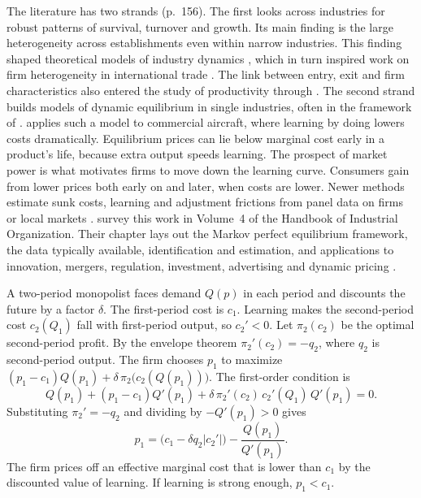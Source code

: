 The literature has two strands (p.~156). The first looks across industries for robust patterns of survival,
turnover and growth. Its main finding is the large heterogeneity across establishments even within narrow
industries. This finding shaped theoretical models of industry dynamics \citep{Hopenhayn1992}, which in turn
inspired work on firm heterogeneity in international trade \citep{Melitz2003}. The link between entry, exit and
firm characteristics also entered the study of productivity through \citet{OlleyPakes1996}. The second strand
builds models of dynamic equilibrium in single industries, often in the framework of \citet{EricsonPakes1995}.
\citet{Benkard2004} applies such a model to commercial aircraft, where learning by doing lowers costs
dramatically. Equilibrium prices can lie below marginal cost early in a product's life, because extra output
speeds learning. The prospect of market power is what motivates firms to move down the learning curve.
Consumers gain from lower prices both early on and later, when costs are lower. Newer methods estimate sunk
costs, learning and adjustment frictions from panel data on firms or local markets
\citep{AguirregabiriaMira2007,BajariBenkardLevin2007,PakesOstrovskyBerry2007}. \citet{AguirregabiriaCollardWexlerRyan2021}
survey this work in Volume~4 of the Handbook of Industrial Organization. Their chapter lays out the Markov
perfect equilibrium framework, the data typically available, identification and estimation, and applications to
innovation, mergers, regulation, investment, advertising and dynamic pricing \citep[Preface, pp.~xvi--xvii]{HoHortacsuLizzeri2021}.

\begin{remark}\label{rem:01-learning}
A two-period monopolist faces demand $Q(p)$ in each period and discounts the future by a factor $\delta$. The
first-period cost is $c_1$. Learning makes the second-period cost $c_2(Q_1)$ fall with first-period output,
so $c_2' < 0$. Let $\pi_2(c_2)$ be the optimal second-period profit. By the envelope theorem
$\pi_2'(c_2) = -q_2$, where $q_2$ is second-period output. The firm chooses $p_1$ to maximize
$(p_1 - c_1)Q(p_1) + \delta\,\pi_2\big(c_2(Q(p_1))\big)$. The first-order condition is
\[
  Q(p_1) + (p_1 - c_1)Q'(p_1) + \delta\,\pi_2'(c_2)\,c_2'(Q_1)\,Q'(p_1) = 0 .
\]
Substituting $\pi_2' = -q_2$ and dividing by $-Q'(p_1) > 0$ gives
\[
  p_1 = \big(c_1 - \delta q_2 \lvert c_2' \rvert\big) - \frac{Q(p_1)}{Q'(p_1)} .
\]
The firm prices off an effective marginal cost that is lower than $c_1$ by the discounted value of learning. If
learning is strong enough, $p_1 < c_1$.
\end{remark}

